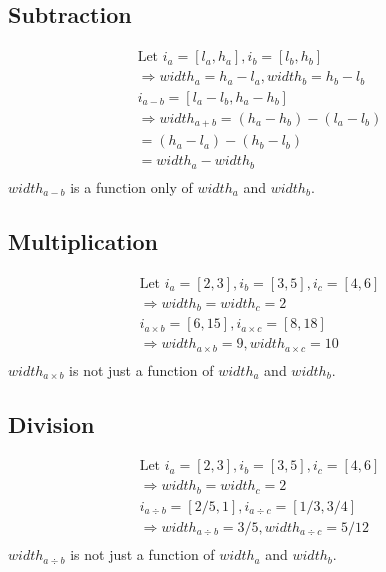 \documentclass{article}
\begin{document}
\subsection{Subtraction}
\begin{equation*}
    \begin{split}
        \textrm{Let }i_a = [l_a, h_a], i_b = [l_b, h_b] \\
        \Rightarrow width_a = h_a - l_a, width_b = h_b - l_b \\
        i_{a-b} = [l_a - l_b, h_a - h_b] \\
        \Rightarrow width_{a+b} = (h_a - h_b) - (l_a - l_b) \\
                                = (h_a - l_a) - (h_b - l_b) \\
                                = width_a - width_b \\
    \end{split}
\end{equation*}
$width_{a-b}$ is a function only of $width_a$ and $width_b$.

\subsection{Multiplication}
\begin{equation*}
    \begin{split}
        \textrm{Let }i_a = [2, 3], i_b = [3, 5], i_c = [4, 6] \\
        \Rightarrow width_b = width_c = 2 \\
        i_{a \times b} = [6, 15], i_{a \times c} = [8, 18] \\
        \Rightarrow width_{a \times b} = 9, width_{a \times c} = 10 \\
    \end{split}
\end{equation*}
$width_{a \times b}$ is not just a function of $width_a$ and $width_b$.

\subsection{Division}
\begin{equation*}
    \begin{split}
        \textrm{Let }i_a = [2, 3], i_b = [3, 5], i_c = [4, 6] \\
        \Rightarrow width_b = width_c = 2 \\
        i_{a \div b} = [2/5, 1], i_{a \div c} = [1/3, 3/4] \\
        \Rightarrow width_{a \div b} = 3/5, width_{a \div c} = 5/12 \\
    \end{split}
\end{equation*}
$width_{a \div b}$ is not just a function of $width_a$ and $width_b$.
\end{document}
